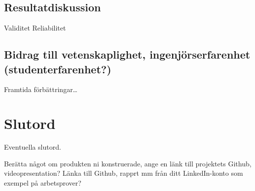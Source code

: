 \documentclass[conference]{IEEEtran}
\begin{document}
\subsection{Resultatdiskussion}
Validitet
Reliabilitet

\subsection{Bidrag till vetenskaplighet, ingenjörserfarenhet (studenterfarenhet?)}
Framtida förbättringar\dots

\section*{Slutord}
Eventuella slutord.

Berätta något om produkten ni konstruerade, ange en länk till projektets Github\cite{Eklund:2}, videopresentation?
Länka till Github, rapprt mm från ditt LinkedIn-konto som exempel på arbetsprover?\cite{DUMMY:1}

\vspace{12pt}



\end{document}

